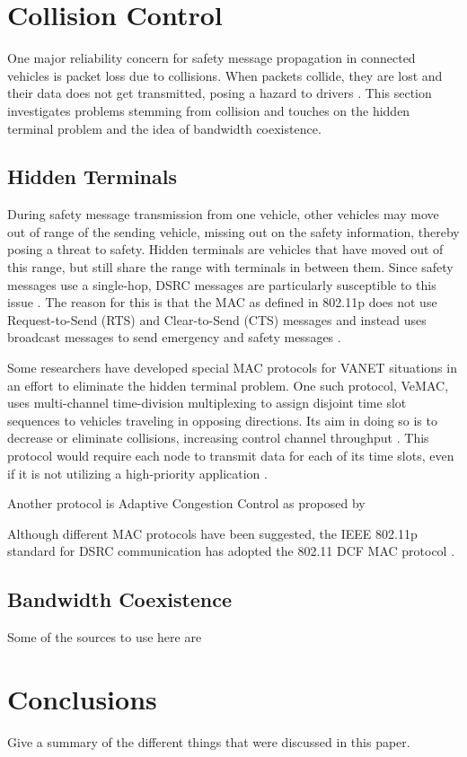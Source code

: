 \documentclass[twoside,conference]{IEEEtran}
\begin{document}
\section{Collision Control}\label{sec:collision}
	One major reliability concern for safety message propagation in connected vehicles is packet loss due to collisions. When packets collide, they are lost and their data does not get transmitted, posing a hazard to drivers \cite{Hassan2011}. This section investigates problems stemming from collision and touches on the hidden terminal problem and the idea of bandwidth coexistence. 

	\subsection{Hidden Terminals}\label{sec:hiddenterminal}
		During safety message transmission from one vehicle, other vehicles may move out of range of the sending vehicle, missing out on the safety information, thereby posing a threat to safety. Hidden terminals are vehicles that have moved out of this range, but still share the range with terminals in between them. Since safety messages use a single-hop, DSRC messages are particularly susceptible to this issue \cite{Ma2009}.  The reason for this is that the MAC as defined in 802.11p does not use Request-to-Send (RTS) and Clear-to-Send (CTS) messages and instead uses broadcast messages to send emergency and safety messages \cite[p. 969]{Rahman2014}. 
		
		Some researchers have developed special MAC protocols for VANET situations in an effort to eliminate the hidden terminal problem. One such protocol, VeMAC, uses multi-channel time-division multiplexing to assign disjoint time slot sequences to vehicles traveling in opposing directions. Its aim in doing so is to decrease or eliminate collisions, increasing control channel throughput \cite{Omar2013}. This protocol would require each node to transmit data for each of its time slots, even if it is not utilizing a high-priority application \cite{Kolte2014}. 
		
		Another protocol is Adaptive Congestion Control as proposed by \cite[p. 3]{Kolte2014}
		
		Although different MAC protocols have been suggested, the IEEE 802.11p standard for DSRC communication has adopted the 802.11 DCF MAC protocol \cite{Hassan2011}. 
		
	\subsection{Bandwidth Coexistence}\label{sec:coexistence}
		Some of the sources to use here are \cite{Lansford2013,Chang2013,Toyota2013,NTIA2013}

\section{Conclusions}\label{sec:conclusions}
	Give a summary of the different things that were discussed in this paper.



\end{document}
